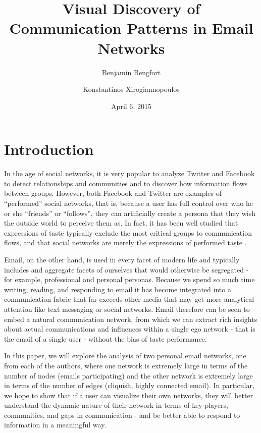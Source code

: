 \documentclass[11pt,letterpaper]{article}
\begin{document}
\title{Visual Discovery of Communication Patterns in Email Networks}

\author[ ]{Benjamin Bengfort}
\author[ ]{Konstantinos Xirogiannopoulos}

\date{April 6, 2015}

\maketitle

\section*{Introduction}

In the age of social networks, it is very popular to analyze Twitter and Facebook to detect relationships and communities and to discover how information flows between groups. However, both Facebook and Twitter are examples of ``performed'' social networks, that is, because a user has full control over who he or she ``friends'' or ``follows'', they can artificially create a persona that they wish the outside world to perceive them as. In fact, it has been well studied that expressions of taste typically exclude the most critical groups to communication flows, and that social networks are merely the expressions of performed taste \cite{liu_social_2007}.

Email, on the other hand, is used in every facet of modern life and typically includes and aggregate facets of ourselves that would otherwise be segregated - for example, professional and personal personas. Because we spend so much time writing, reading, and responding to email it has become integrated into a communication fabric that far exceeds other media that may get more analytical attention like text messaging or social networks. Email therefore can be seen to embed a natural communication network, from which we can extract rich insights about actual communications and influences within a single ego network - that is the email  of a single user - without the bias of taste performance.

In this paper, we will explore the analysis of two personal email networks, one from each of the authors, where one network is extremely large in terms of the number of nodes (emails participating) and the other network is extremely large in terms of the number of edges (cliquish, highly connected email). In particular, we hope to show that if a user can visualize their own networks, they will better understand the dynamic nature of their network in terms of key players, communities, and gaps in communication - and be better able to respond to information in a meaningful way.
\end{document}

